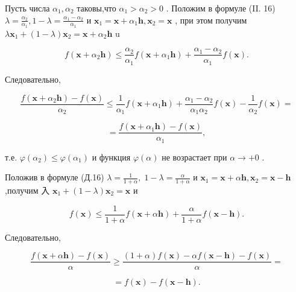 \documentclass[8pt]{extarticle}
\begin{document}
Пусть числа \({\alpha }_{1},{\alpha }_{2}\) таковы,что \({\alpha }_{1} > {\alpha }_{2} > 0\) . Положим в формуле (II. 16) \(\lambda  = \frac{{\alpha }_{2}}{{\alpha }_{1}},1 - \lambda  = \frac{{\alpha }_{1} - {\alpha }_{2}}{{\alpha }_{1}}\) и \({\mathbf{x}}_{1} = \mathbf{x} + {\alpha }_{1}\mathbf{h},{\mathbf{x}}_{2} = \mathbf{x}\) , при этом получим \(\lambda {\mathbf{x}}_{1} + \left( {1 - \lambda }\right) {\mathbf{x}}_{2} = \mathbf{x} + {\alpha }_{2}\mathbf{h}\) u

\[
f\left( {\mathbf{x} + {\alpha }_{2}\mathbf{h}}\right)  \leq  \frac{{\alpha }_{2}}{{\alpha }_{1}}f\left( {\mathbf{x} + {\alpha }_{1}\mathbf{h}}\right)  + \frac{{\alpha }_{1} - {\alpha }_{2}}{{\alpha }_{1}}f\left( \mathbf{x}\right) .
\]

Следовательно,

\[
\frac{f\left( {\mathbf{x} + {\alpha }_{2}\mathbf{h}}\right)  - f\left( \mathbf{x}\right) }{{\alpha }_{2}} \leq  \frac{1}{{\alpha }_{1}}f\left( {\mathbf{x} + {\alpha }_{1}\mathbf{h}}\right)  + \frac{{\alpha }_{1} - {\alpha }_{2}}{{\alpha }_{1}{\alpha }_{2}}f\left( \mathbf{x}\right)  - \frac{1}{{\alpha }_{2}}f\left( \mathbf{x}\right)  =
\]

\[
= \frac{f\left( {\mathbf{x} + {\alpha }_{1}\mathbf{h}}\right)  - f\left( \mathbf{x}\right) }{{\alpha }_{1}},
\]

т.е. \(\varphi \left( {\alpha }_{2}\right)  \leq  \varphi \left( {\alpha }_{1}\right)\) и функция \(\varphi \left( \alpha \right)\) не возрастает при \(\alpha  \rightarrow   + 0\) .

Положив в формуле (Д.16) \(\lambda  = \frac{1}{1 + \alpha },\;1 - \lambda  = \frac{\alpha }{1 + \alpha }\) и \({\mathbf{x}}_{1} = \mathbf{x} + \alpha \mathbf{h},{\mathbf{x}}_{2} = \mathbf{x} - \mathbf{h}\) ,получим 入 \({\mathbf{x}}_{1} + \left( {1 - \lambda }\right) {\mathbf{x}}_{2} = \mathbf{x}\) и

\[
f\left( \mathbf{x}\right)  \leq  \frac{1}{1 + \alpha }f\left( {\mathbf{x} + \alpha \mathbf{h}}\right)  + \frac{\alpha }{1 + \alpha }f\left( {\mathbf{x} - \mathbf{h}}\right) .
\]

Следовательно,

\[
\frac{f\left( {\mathbf{x} + \alpha \mathbf{h}}\right)  - f\left( \mathbf{x}\right) }{\alpha } \geq  \frac{\left( {1 + \alpha }\right) f\left( \mathbf{x}\right)  - {\alpha f}\left( {\mathbf{x} - \mathbf{h}}\right)  - f\left( \mathbf{x}\right) }{\alpha } =
\]

\[
= f\left( \mathbf{x}\right)  - f\left( {\mathbf{x} - \mathbf{h}}\right) .
\]
\end{document}

